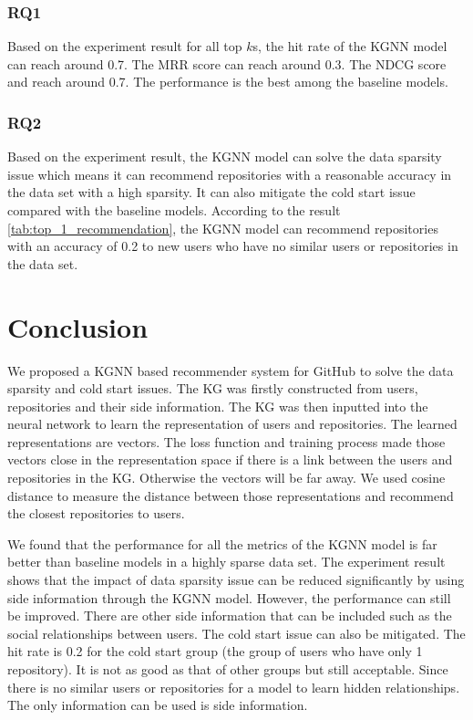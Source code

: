\documentclass[11pt,twoside]{report}
\begin{document}
\subsection{RQ1}
Based on the experiment result for all top $k$s, the hit rate of the KGNN model can reach around 0.7. The MRR score can reach around 0.3. The NDCG score and reach around 0.7. The performance is the best among the baseline models.

\subsection{RQ2}
Based on the experiment result, the KGNN model can solve the data sparsity issue which means it can recommend repositories with a reasonable accuracy in the data set with a high sparsity. It can also mitigate the cold start issue compared with the baseline models. According to the result \ref{tab:top_1_recommendation}, the KGNN model can recommend repositories with an accuracy of 0.2 to new users who have no similar users or repositories in the data set.

\chapter{Conclusion}
We proposed a KGNN based recommender system for GitHub to solve the data sparsity and cold start issues. The KG was firstly constructed from users, repositories and their side information. The KG was then inputted into the neural network to learn the representation of users and repositories. The learned representations are vectors. The loss function and training process made those vectors close in the representation space if there is a link between the users and repositories in the KG. Otherwise the vectors will be far away. We used cosine distance to measure the distance between those representations and recommend the closest repositories to users.

We found that the performance for all the metrics of the KGNN model is far better than baseline models in a highly sparse data set. The experiment result shows that the impact of data sparsity issue can be reduced significantly by using side information through the KGNN model. However, the performance can still be improved. There are other side information that can be included such as the social relationships between users. The cold start issue can also be mitigated. The hit rate is 0.2 for the cold start group (the group of users who have only 1 repository). It is not as good as that of other groups but still acceptable. Since there is no similar users or repositories for a model to learn hidden relationships. The only information can be used is side information.
\end{document}
